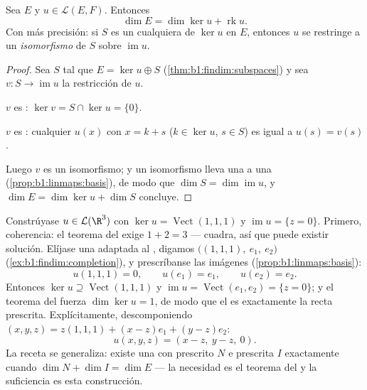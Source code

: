 \begin{theorem}\label{thm:b1:linmaps:ranknullity}
Sea $E$  y $u \in \mathcal{L}(E, F)$.
Entonces
\[
\dim E = \dim \ker u + \operatorname{rk} u .
\]
Con más precisión: si $S$ es un   cualquiera de
$\ker u$ en $E$, entonces $u$ se restringe a un \emph{isomorfismo} de
$S$ sobre $\operatorname{im} u$.
\end{theorem}

\begin{proof}
Sea $S$ tal que $E = \ker u \oplus S$
(\cref{thm:b1:findim:subspaces}) y sea
$v \colon S \to \operatorname{im} u$ la restricción de $u$.

$v$ es : $\ker v = S \cap \ker u = \{0\}$.

$v$ es : cualquier $u(x)$ con $x = k + s$
($k \in \ker u$, $s \in S$) es igual a $u(s) = v(s)$.

Luego $v$ es un isomorfismo; y un isomorfismo lleva una  a una
 (\cref{prop:b1:linmaps:basis}), de modo que
$\dim S = \dim\operatorname{im} u$, y
$\dim E = \dim\ker u + \dim S$ concluye.
\end{proof}

\begin{example}
\label{ex:b1:linmaps:tospec}
Constrúyase $u \in \mathcal{L}(\R^3)$ con
$\ker u = \operatorname{Vect}(1,1,1)$ y
$\operatorname{im} u = \{z = 0\}$. Primero, coherencia: el teorema
del  exige $1 + 2 = 3$ --- cuadra, así que puede existir
solución. Elíjase una  adaptada al , digamos
$\bigl((1,1,1),\ e_1,\ e_2\bigr)$
(\cref{ex:b1:findim:completion}), y prescríbanse las imágenes
(\cref{prop:b1:linmaps:basis}):
\[
u(1,1,1) = 0, \qquad u(e_1) = e_1, \qquad u(e_2) = e_2 .
\]
Entonces $\ker u \supseteq \operatorname{Vect}(1,1,1)$ y
$\operatorname{im} u = \operatorname{Vect}(e_1, e_2) = \{z = 0\}$; y
el teorema del  fuerza $\dim\ker u = 1$, de modo que el 
es exactamente la recta prescrita. Explícitamente, descomponiendo
$(x, y, z) = z(1,1,1) + (x - z)e_1 + (y - z)e_2$:
\[
u(x, y, z) = (x - z,\ y - z,\ 0).
\]
La receta se generaliza: existe una  con 
prescrito $N$ e  prescrita $I$ exactamente cuando
$\dim N + \dim I = \dim E$ --- la necesidad es el teorema del  y
la suficiencia es esta construcción.
\end{example}

